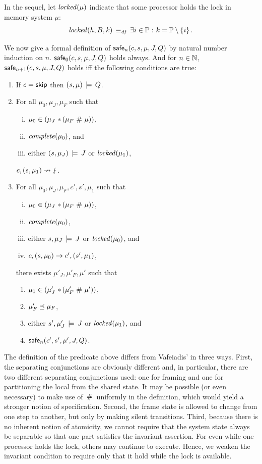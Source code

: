 \documentclass[11pt]{report}
\begin{document}
In the sequel, let $\mathit{locked}(\mu)$ indicate that some processor holds the lock in memory system $\mu$: \[ \mathit{locked}(h,B,k) \operatorname{\;\equiv_{\mathit{df}}\;} \exists i \in \mathbb{P} \operatorname{\,:\,} k = \mathbb{P} \setminus \left\lbrace i \right\rbrace. \]

We now give a formal definition of $\mathsf{safe}_{n}(c,s,\mu,J,Q)$ by natural number induction on $n$. $\mathsf{safe}_{0}(c,s,\mu,J,Q)$ holds always. And for $n \in \mathbb{N}$, $\mathsf{safe}_{n+1}(c,s,\mu,J,Q)$ holds iff the following conditions are true: \begin{enumerate}
  \item If $c = \operatorname{\mathsf{skip}}$ then $(s,\mu) \,\models\, Q$.

  \item For all $\mu_0,\mu_J,\mu_F$ such that \begin{enumerate}[(i)]
    \item $\mu_0 \in (\mu_J \operatorname{\,\ast\,} (\mu_F \operatorname{\,\#\,} \mu))$,
    \item $\mathit{complete}(\mu_0)$, and
    \item either $(s,\mu_J) \,\models\, J$ or $\mathit{locked}(\mu_1)$,
  \end{enumerate} $c,(s,\mu_1) \nrightarrow \lightning$.

  \item For all $\mu_0,\mu_J,\mu_F,c',s',\mu_1$ such that \begin{enumerate}[(i)]
    \item $\mu_0 \in (\mu_J \operatorname{\,\ast\,} (\mu_F \operatorname{\,\#\,} \mu))$,
    \item $\mathit{complete}(\mu_0)$,
    \item either $s,\mu_J \,\models\, J$ or $\mathit{locked}(\mu_0)$, and 
    \item $c,(s,\mu_0) \rightarrow c',(s',\mu_1)$,
  \end{enumerate} there exists $\mu'_J,\mu'_F,\mu'$ such that \begin{enumerate}
    \item $\mu_1 \in (\mu'_J \operatorname{\,\ast\,} (\mu'_F \operatorname{\,\#\,} \mu'))$,
    \item $\mu'_F \preceq \mu_F$,
    \item either $s',\mu'_J \,\models\, J$ or $\mathit{locked}(\mu_1)$, and
    \item $\mathsf{safe}_{n}(c',s',\mu',J,Q)$.
  \end{enumerate}

\end{enumerate}

The definition of the predicate above differs from Vafeiadis' in three ways. First, the separating conjunctions are obviously different and, in particular, there are two different separating conjunctions used: one for framing and one for partitioning the local from the shared state. It may be possible (or even necessary) to make use of $\operatorname{\,\#\,}$ uniformly in the definition, which would yield a stronger notion of specification. Second, the frame state is allowed to change from one step to another, but only by making silent transitions. Third, because there is no inherent notion of atomicity, we cannot require that the system state always be separable so that one part satisfies the invariant assertion. For even while one processor holds the lock, others may continue to execute. Hence, we weaken the invariant condition to require only that it hold while the lock is available.
\end{document}
